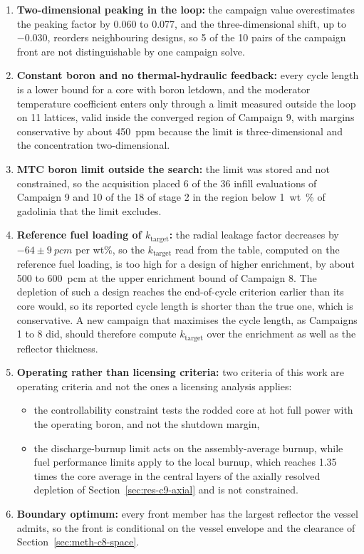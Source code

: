 \begin{enumerate}
  \item \textbf{Two-dimensional peaking in the loop:} the campaign
        value overestimates the peaking factor by 0.060 to 0.077, and
        the three-dimensional shift, up to $-0.030$, reorders
        neighbouring designs, so 5 of the 10 pairs of the campaign
        front are not distinguishable by one campaign solve.
  \item \textbf{Constant boron and no thermal-hydraulic feedback:}
        every cycle length is a lower bound for a core with boron
        letdown, and the moderator temperature coefficient enters only
        through a limit measured outside the loop on 11 lattices, valid
        inside the converged region of Campaign 9, with margins
        conservative by about \SI{450}{ppm} because the limit is
        three-dimensional and the concentration two-dimensional.
  \item \textbf{MTC boron limit outside the search:} the limit was
        stored and not constrained, so the acquisition placed 6 of the
        36 infill evaluations of Campaign 9 and 10 of the 18 of stage 2
        in the region below \SI{1}{wt\%} of gadolinia that the limit
        excludes.
    \item \textbf{Reference fuel loading of $k_\mathrm{target}$:} the
        radial leakage factor decreases by $-64 \pm \SI{9}{pcm}$ per
        wt\%, so the $k_\mathrm{target}$ read from the table, computed on
        the reference fuel loading, is too high for a design of higher
        enrichment, by about 500 to \SI{600}{pcm} at the upper
        enrichment bound of Campaign 8. The depletion of such a design
        reaches the end-of-cycle criterion earlier than its core would,
        so its reported cycle length is shorter than the true one, which
        is conservative. A new campaign that maximises the cycle length,
        as Campaigns 1 to 8 did, should therefore compute
        $k_\mathrm{target}$ over the enrichment as well as the reflector
        thickness.
    \item \textbf{Operating rather than licensing criteria:} two criteria
        of this work are operating criteria and not the ones a licensing
        analysis applies:
        \begin{itemize}
          \item the controllability constraint tests the rodded core at
                hot full power with the operating boron, and not the
                shutdown margin,
          \item the discharge-burnup limit acts on the assembly-average
                burnup, while fuel performance limits apply to the local
                burnup, which reaches 1.35 times the core average in the
                central layers of the axially resolved depletion of
                Section~\ref{sec:res-c9-axial} and is not constrained.
        \end{itemize}
  \item \textbf{Boundary optimum:} every front member has the largest
        reflector the vessel admits, so the front is conditional on the
        vessel envelope and the clearance of
        Section~\ref{sec:meth-c8-space}.
\end{enumerate}

